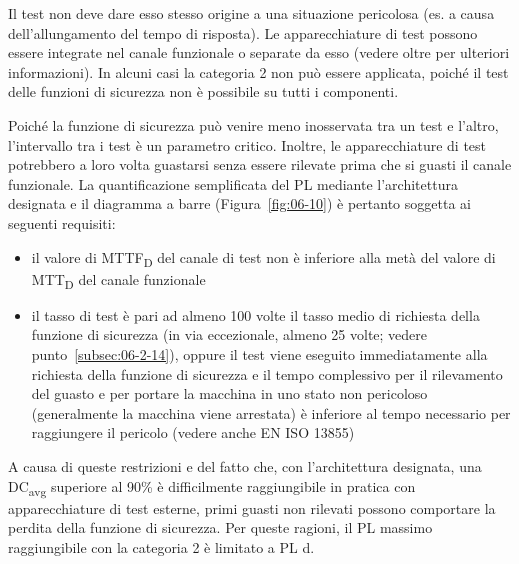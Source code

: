 \begin{center}
    \begin{minipage}{\textwidth}
        \centering
        \captionsetup{hypcap=false}
        \resizebox{0.85\textwidth}{!}{}
        \label{fig:06-06}
    \end{minipage}
\end{center}

Il test non deve dare esso stesso origine a una situazione pericolosa (es. a causa dell'allungamento del tempo di risposta). Le apparecchiature di test possono essere integrate nel canale funzionale o separate da esso (vedere oltre per ulteriori informazioni). In alcuni casi la categoria 2 non può essere applicata, poiché il test delle funzioni di sicurezza non è possibile su tutti i componenti.

Poiché la funzione di sicurezza può venire meno inosservata tra un test e l'altro, l'intervallo tra i test è un parametro critico. Inoltre, le apparecchiature di test potrebbero a loro volta guastarsi senza essere rilevate prima che si guasti il canale funzionale. La quantificazione semplificata del PL mediante l'architettura designata e il diagramma a barre (Figura~\ref{fig:06-10}) è pertanto soggetta ai seguenti requisiti:
\begin{itemize}
    \item il valore di MTTF\textsubscript{D} del canale di test non è inferiore alla metà del valore di MTT\textsubscript{D} del canale funzionale
    \item il tasso di test è pari ad almeno 100 volte il tasso medio di richiesta della funzione di sicurezza (in via eccezionale, almeno 25 volte; vedere punto~\ref{subsec:06-2-14}), oppure il test viene eseguito immediatamente alla richiesta della funzione di sicurezza e il tempo complessivo per il rilevamento del guasto e per portare la macchina in uno stato non pericoloso (generalmente la macchina viene arrestata) è inferiore al tempo necessario per raggiungere il pericolo (vedere anche EN ISO 13855)
\end{itemize}

A causa di queste restrizioni e del fatto che, con l'architettura designata, una DC\textsubscript{avg} superiore al 90\% è difficilmente raggiungibile in pratica con apparecchiature di test esterne, primi guasti non rilevati possono comportare la perdita della funzione di sicurezza. Per queste ragioni, il PL massimo raggiungibile con la categoria 2 è limitato a PL d.


